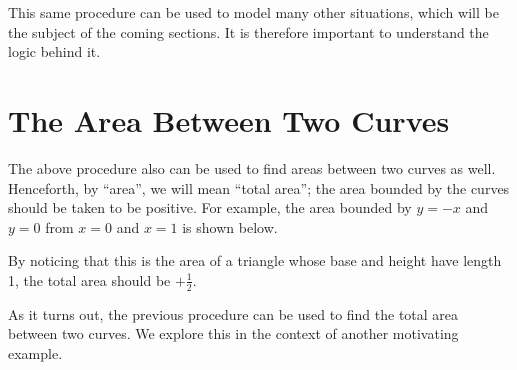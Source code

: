 \documentclass{ximera}
\begin{document}
This same procedure can be used to model many other situations, which will be the subject of the coming sections.  It is therefore important to understand the logic behind it.




\section{The Area Between Two Curves}

The above procedure also can be used to find areas between two curves as well.  Henceforth, by ``area'', we will mean ``total area''; the area bounded by the curves should be taken to be positive.  For example, the area bounded by $y=-x$ and $y=0$ from $x=0$ and $x=1$ is shown below.  

\begin{image}
\end{image}

By noticing that this is the area of a triangle whose base and height have length 1, the total area should be $+\frac{1}{2}$.

As it turns out, the previous procedure can be used to find the total area between two curves.  We explore this in the context of another motivating example.
\end{document}
